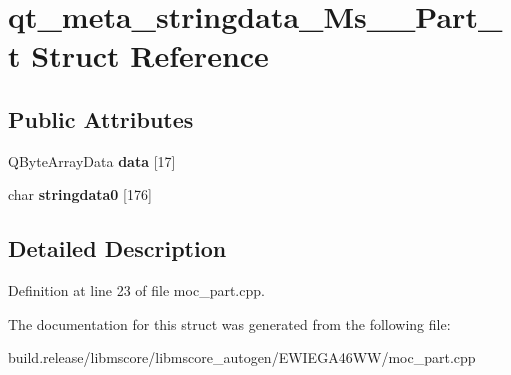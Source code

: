 \hypertarget{structqt__meta__stringdata___ms_____part__t}{}\section{qt\+\_\+meta\+\_\+stringdata\+\_\+\+Ms\+\_\+\+\_\+\+Part\+\_\+t Struct Reference}
\label{structqt__meta__stringdata___ms_____part__t}
\subsection*{Public Attributes}
\begin{DoxyCompactItemize}
\item 
\mbox{\label{structqt__meta__stringdata___ms_____part__t_a43eade178333525d450f6765daa63f1f}} 
Q\+Byte\+Array\+Data {\bfseries data} \mbox{[}17\mbox{]}
\item 
\mbox{\label{structqt__meta__stringdata___ms_____part__t_a4dc856f17d98b113036d04609978bac4}} 
char {\bfseries stringdata0} \mbox{[}176\mbox{]}
\end{DoxyCompactItemize}


\subsection{Detailed Description}


Definition at line 23 of file moc\+\_\+part.\+cpp.



The documentation for this struct was generated from the following file\+:\begin{DoxyCompactItemize}
\item 
build.\+release/libmscore/libmscore\+\_\+autogen/\+E\+W\+I\+E\+G\+A46\+W\+W/moc\+\_\+part.\+cpp\end{DoxyCompactItemize}
